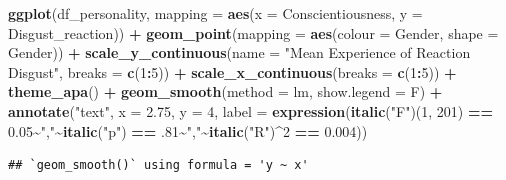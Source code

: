 \documentclass[
]{book}
\newenvironment{Shaded}{\begin{snugshade}}{\end{snugshade}}
\newcommand{\AttributeTok}[1]{\textcolor[rgb]{0.13,0.29,0.53}{#1}}
\newcommand{\DecValTok}[1]{\textcolor[rgb]{0.00,0.00,0.81}{#1}}
\newcommand{\FloatTok}[1]{\textcolor[rgb]{0.00,0.00,0.81}{#1}}
\newcommand{\FunctionTok}[1]{\textcolor[rgb]{0.13,0.29,0.53}{\textbf{#1}}}
\newcommand{\NormalTok}[1]{#1}
\newcommand{\SpecialCharTok}[1]{\textcolor[rgb]{0.81,0.36,0.00}{\textbf{#1}}}
\newcommand{\StringTok}[1]{\textcolor[rgb]{0.31,0.60,0.02}{#1}}
\begin{document}
\begin{Shaded}
\begin{Highlighting}[]
\FunctionTok{ggplot}\NormalTok{(df\_personality, }\AttributeTok{mapping =} \FunctionTok{aes}\NormalTok{(}\AttributeTok{x =}\NormalTok{ Conscientiousness, }\AttributeTok{y =}\NormalTok{ Disgust\_reaction)) }\SpecialCharTok{+}
  \FunctionTok{geom\_point}\NormalTok{(}\AttributeTok{mapping =} \FunctionTok{aes}\NormalTok{(}\AttributeTok{colour =}\NormalTok{ Gender, }\AttributeTok{shape =}\NormalTok{ Gender)) }\SpecialCharTok{+}
  \FunctionTok{scale\_y\_continuous}\NormalTok{(}\AttributeTok{name =} \StringTok{"Mean Experience of Reaction Disgust"}\NormalTok{, }\AttributeTok{breaks =} \FunctionTok{c}\NormalTok{(}\DecValTok{1}\SpecialCharTok{:}\DecValTok{5}\NormalTok{)) }\SpecialCharTok{+}
  \FunctionTok{scale\_x\_continuous}\NormalTok{(}\AttributeTok{breaks =} \FunctionTok{c}\NormalTok{(}\DecValTok{1}\SpecialCharTok{:}\DecValTok{5}\NormalTok{)) }\SpecialCharTok{+}
  \FunctionTok{theme\_apa}\NormalTok{() }\SpecialCharTok{+}
  \FunctionTok{geom\_smooth}\NormalTok{(}\AttributeTok{method =}\NormalTok{ lm, }\AttributeTok{show.legend =}\NormalTok{ F) }\SpecialCharTok{+}
  \FunctionTok{annotate}\NormalTok{(}\StringTok{"text"}\NormalTok{, }\AttributeTok{x =} \FloatTok{2.75}\NormalTok{, }\AttributeTok{y =} \DecValTok{4}\NormalTok{,}
           \AttributeTok{label =} \FunctionTok{expression}\NormalTok{(}\FunctionTok{italic}\NormalTok{(}\StringTok{"F"}\NormalTok{)(}\DecValTok{1}\NormalTok{, }\DecValTok{201}\NormalTok{) }\SpecialCharTok{==} \FloatTok{0.05}\SpecialCharTok{\textasciitilde{}}\StringTok{","}\SpecialCharTok{\textasciitilde{}}\FunctionTok{italic}\NormalTok{(}\StringTok{"p"}\NormalTok{) }\SpecialCharTok{==}\NormalTok{ .}\DecValTok{81}\SpecialCharTok{\textasciitilde{}}\StringTok{","}\SpecialCharTok{\textasciitilde{}}\FunctionTok{italic}\NormalTok{(}\StringTok{"R"}\NormalTok{)}\SpecialCharTok{\^{}}\DecValTok{2} \SpecialCharTok{==} \FloatTok{0.004}\NormalTok{))}
\end{Highlighting}
\end{Shaded}

\begin{verbatim}
## `geom_smooth()` using formula = 'y ~ x'
\end{verbatim}
\end{document}
